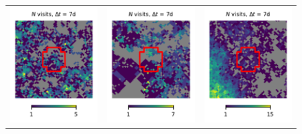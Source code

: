 \documentclass[preprintm,linenumbers]{aastex631}
\begin{document}
\begin{figure}
\begin{tabular}{  c c c}
				\includegraphics{results/skymaps_cutout/skymaps_cutout_first_year_one_snap_v4_0_10yrs_db_noDD_noTwi_tscale-7_nside-256_doAllTemplateMetrics_reduceCount_g_NES_noDD_noTwi.pdf} &
				\includegraphics{results/skymaps_cutout/skymaps_cutout_first_year_one_snap_v4_0_10yrs_db_noDD_noTwi_tscale-7_nside-256_doAllTemplateMetrics_reduceCount_g_WFD_noDD_noTwi.pdf} &
				\includegraphics{results/skymaps_cutout/skymaps_cutout_first_year_one_snap_v4_0_10yrs_db_noDD_noTwi_tscale-7_nside-256_doAllTemplateMetrics_reduceCount_g_GP_noDD_noTwi.pdf} \\

\end{tabular}
\end{figure}
\end{document}
